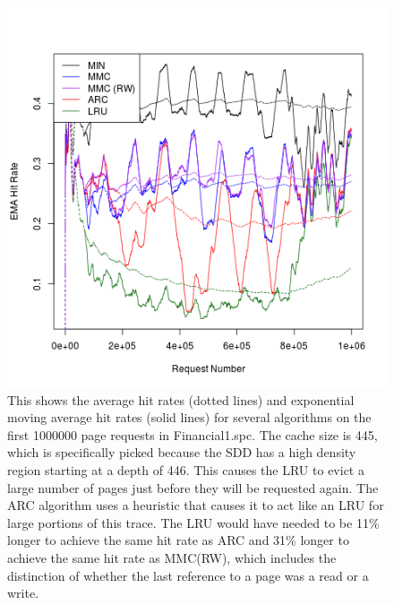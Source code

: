   \begin{figure}
  \centering
  \includegraphics[width=6in]{../media/ts_445_445_1780_2.png}
  \caption[Rolling hit rate for 445 page caches on trace Financial1.spc]{This
  shows the average hit rates (dotted lines) and exponential moving average hit
  rates (solid lines) for several algorithms on the first 1000000 page requests
  in Financial1.spc. The cache size is 445, which is specifically picked because
  the SDD has a high density region starting at a depth of 446. This causes the
  LRU to evict a large number of pages just before they will be requested again.
  The ARC algorithm uses a heuristic that causes it to act like an LRU for large
  portions of this trace. The LRU would have needed to be 11\% longer to achieve
  the same hit rate as ARC and 31\% longer to achieve the same hit rate as
  MMC(RW), which includes the distinction of whether the last reference to a
  page was a read or a write.}
  \label{fig:ts_445_financial1}
  \end{figure}

